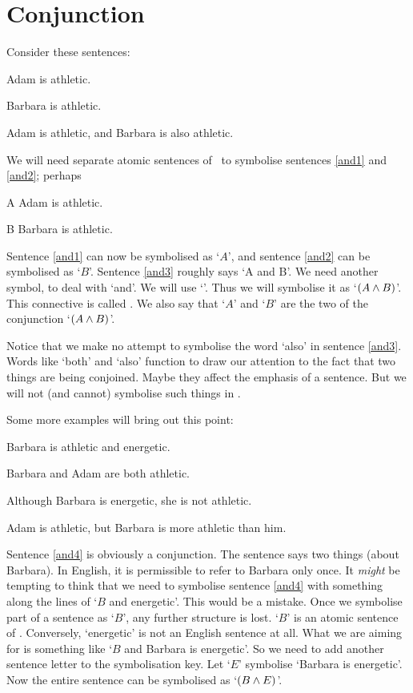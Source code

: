 \section{Conjunction}\label{s:ConnectiveConjunction}
Consider these sentences:
	\begin{earg}
		\item[\ex{and1}]Adam is athletic.
		\item[\ex{and2}]Barbara is athletic.
		\item[\ex{and3}]Adam is athletic, and Barbara is also athletic.
	\end{earg}
We will need separate atomic sentences of \TFL\ to symbolise sentences \ref{and1} and \ref{and2}; perhaps
	\begin{ekey}
		\item[A] Adam is athletic.
		\item[B] Barbara is athletic.
	\end{ekey}
Sentence \ref{and1} can now be symbolised as `$A$', and sentence \ref{and2} can be symbolised as `$B$'. Sentence \ref{and3} roughly says `A and B'. We need another symbol, to deal with `and'. We will use `\eand'. Thus we will symbolise it as `$(A\wedge B)$'. This connective is called . We also say that `$A$' and `$B$' are the two  of the conjunction `$(A \wedge B)$'.

Notice that we make no attempt to symbolise the word `also' in sentence \ref{and3}. Words like `both' and `also' function to draw our attention to the fact that two things are being conjoined. Maybe they affect the emphasis of a sentence. But we will not (and cannot) symbolise such things in \TFL.

Some more examples will bring out this point:
	\begin{earg}
		\item[\ex{and4}]Barbara is athletic and energetic.
		\item[\ex{and5}]Barbara and Adam are both athletic.
		\item[\ex{and6}]Although Barbara is energetic, she is not athletic.
	\item[\ex{and7}]Adam is athletic, but Barbara is more athletic than him.
	\end{earg}
Sentence \ref{and4} is obviously a conjunction. The sentence says two things (about Barbara). In English, it is permissible to refer to Barbara only once. It \emph{might} be tempting to think that we need to symbolise sentence \ref{and4} with something along the lines of `$B$ and energetic'. This would be a mistake. Once we symbolise part of a sentence as `$B$', any further structure is lost. `$B$' is an atomic sentence of \TFL. Conversely, `energetic' is not an English sentence at all. What we are aiming for is something like `$B$ and Barbara is energetic'. So we need to add another sentence letter to the symbolisation key. Let `$E$' symbolise `Barbara is energetic'. Now the entire sentence can be symbolised as `$(B\wedge E)$'.

